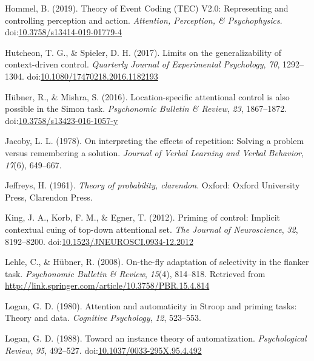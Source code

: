 \documentclass[english,,man,floatsintext]{apa6}
\begin{document}
\leavevmode\hypertarget{ref-hommel_theory_2019}{}%
Hommel, B. (2019). Theory of Event Coding (TEC) V2.0: Representing and controlling perception and action. \emph{Attention, Perception, \& Psychophysics}. doi:\href{https://doi.org/10.3758/s13414-019-01779-4}{10.3758/s13414-019-01779-4}

\leavevmode\hypertarget{ref-hutcheon_limits_2017}{}%
Hutcheon, T. G., \& Spieler, D. H. (2017). Limits on the generalizability of context-driven control. \emph{Quarterly Journal of Experimental Psychology}, \emph{70}, 1292--1304. doi:\href{https://doi.org/10.1080/17470218.2016.1182193}{10.1080/17470218.2016.1182193}

\leavevmode\hypertarget{ref-hubner_location-specific_2016}{}%
Hübner, R., \& Mishra, S. (2016). Location-specific attentional control is also possible in the Simon task. \emph{Psychonomic Bulletin \& Review}, \emph{23}, 1867--1872. doi:\href{https://doi.org/10.3758/s13423-016-1057-y}{10.3758/s13423-016-1057-y}

\leavevmode\hypertarget{ref-jacoby_interpreting_1978}{}%
Jacoby, L. L. (1978). On interpreting the effects of repetition: Solving a problem versus remembering a solution. \emph{Journal of Verbal Learning and Verbal Behavior}, \emph{17}(6), 649--667.

\leavevmode\hypertarget{ref-jeffreys1961theory}{}%
Jeffreys, H. (1961). \emph{Theory of probability, clarendon}. Oxford: Oxford University Press, Clarendon Press.

\leavevmode\hypertarget{ref-king_priming_2012}{}%
King, J. A., Korb, F. M., \& Egner, T. (2012). Priming of control: Implicit contextual cuing of top-down attentional set. \emph{The Journal of Neuroscience}, \emph{32}, 8192--8200. doi:\href{https://doi.org/10.1523/JNEUROSCI.0934-12.2012}{10.1523/JNEUROSCI.0934-12.2012}

\leavevmode\hypertarget{ref-lehle_fly_2008}{}%
Lehle, C., \& Hübner, R. (2008). On-the-fly adaptation of selectivity in the flanker task. \emph{Psychonomic Bulletin \& Review}, \emph{15}(4), 814--818. Retrieved from \url{http://link.springer.com/article/10.3758/PBR.15.4.814}

\leavevmode\hypertarget{ref-logan_attention_1980}{}%
Logan, G. D. (1980). Attention and automaticity in Stroop and priming tasks: Theory and data. \emph{Cognitive Psychology}, \emph{12}, 523--553.

\leavevmode\hypertarget{ref-logan_toward_1988}{}%
Logan, G. D. (1988). Toward an instance theory of automatization. \emph{Psychological Review}, \emph{95}, 492--527. doi:\href{https://doi.org/10.1037/0033-295X.95.4.492}{10.1037/0033-295X.95.4.492}
\end{document}
